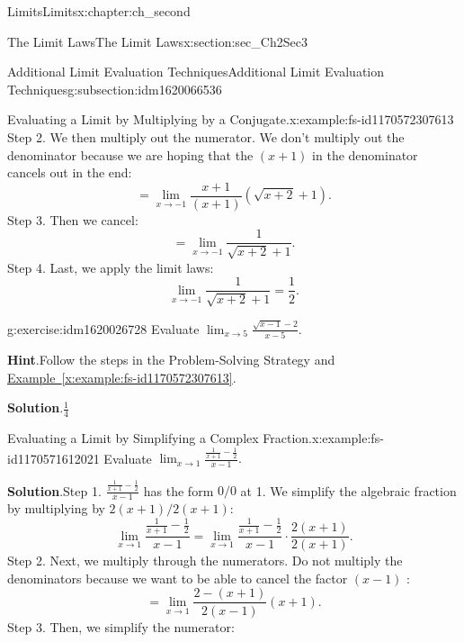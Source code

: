 \documentclass[oneside,10pt,]{book}
\newcommand{\blocktitlefont}{\relax}
\newcommand{\xreffont}{\relax}
\numberwithin{equation}{section}
\begin{document}
\begin{chapterptx}{Limits}{}{Limits}{}{}{x:chapter:ch_second}
\begin{sectionptx}{The Limit Laws}{}{The Limit Laws}{}{}{x:section:sec_Ch2Sec3}
\begin{subsectionptx}{Additional Limit Evaluation Techniques}{}{Additional Limit Evaluation Techniques}{}{}{g:subsection:idm1620066536}
\begin{example}{Evaluating a Limit by Multiplying by a Conjugate.}{x:example:fs-id1170572307613}
\begin{equation*}
\end{equation*}
Step 2. We then multiply out the numerator. We don’t multiply out the denominator because we are hoping that the \((x+1)\) in the denominator cancels out in the end:%
%
\begin{equation*}
=\lim_{x \to -1 }\frac{x+1}{(x+1)}{(\sqrt{x+2}+1)}.
\end{equation*}
Step 3. Then we cancel:%
%
\begin{equation*}
=\lim_{x \to -1 }\frac{1}{\sqrt{x+2}+1}.
\end{equation*}
Step 4. Last, we apply the limit laws:%
%
\begin{equation*}
\lim_{x \to -1 }\frac{1}{\sqrt{x+2}+1}=\frac{1}{2}.
\end{equation*}
\end{example}
\begin{inlineexercise}{}{g:exercise:idm1620026728}%
Evaluate \(\lim_{x \to 5 }\frac{\sqrt{x-1}-2}{x-5}.\)%
\par\smallskip%
\noindent\textbf{\blocktitlefont Hint}.\hypertarget{g:hint:idm1620027624}{}\quad{}Follow the steps in the Problem-Solving Strategy and \hyperref[x:example:fs-id1170572307613]{Example~{\xreffont\ref{x:example:fs-id1170572307613}}}.%
\par\smallskip%
\noindent\textbf{\blocktitlefont Solution}.\hypertarget{g:solution:idm1620020712}{}\quad{}\(\frac{1}{4}\)%
\end{inlineexercise}%
\begin{example}{Evaluating a Limit by Simplifying a Complex Fraction.}{x:example:fs-id1170571612021}%
Evaluate \(\lim_{x \to 1 }\frac{\frac{1}{x+1}-\frac{1}{2}}{x-1}.\)%
\par\smallskip%
\noindent\textbf{\blocktitlefont Solution}.\hypertarget{g:solution:idm1620020072}{}\quad{}Step 1. \(\frac{\frac{1}{x+1}-\frac{1}{2}}{x-1}\) has the form \(0/0\) at 1. We simplify the algebraic fraction by multiplying by \(2(x+1)/2(x+1):\)%
%
\begin{equation*}
\lim_{x \to 1 }\frac{\frac{1}{x+1}-\frac{1}{2}}{x-1}=\lim_{x \to 1 }\frac{\frac{1}{x+1}-\frac{1}{2}}{x-1}\cdot \frac{2(x+1)}{2(x+1)}.
\end{equation*}
Step 2. Next, we multiply through the numerators. Do not multiply the denominators because we want to be able to cancel the factor \((x-1)\text{ : }\)%
%
\begin{equation*}
=\lim_{x \to 1 }\frac{2-(x+1)}{2(x-1)}{(x+1)}.
\end{equation*}
Step 3. Then, we simplify the numerator:%

\end{example}
\end{subsectionptx}
\end{sectionptx}
\end{chapterptx}
\end{document}
